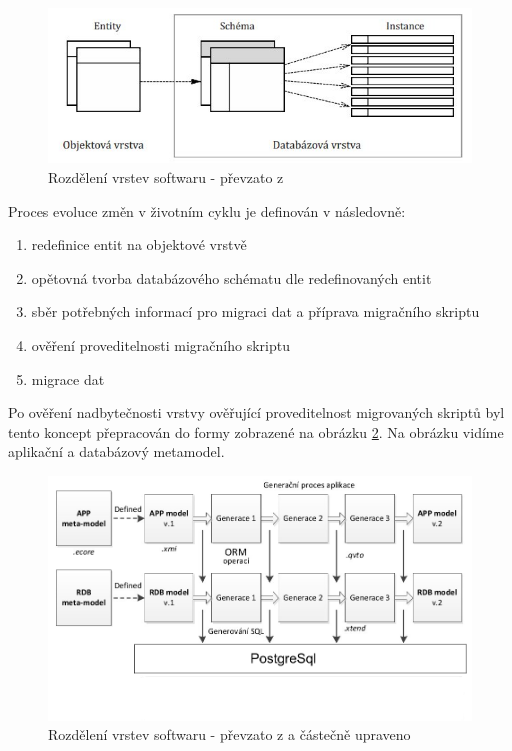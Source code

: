 \documentclass[11pt,twoside,a4paper]{book}
\begin{document}
\begin{figure}[H]
\begin{center}
\includegraphics[width=15cm]{figures/framework_structura}
\caption{Rozdělení vrstev softwaru - převzato z \cite{Mazanec}}
\label{fig:mazanma:framework}
\end{center}
\end{figure}
%
Proces evoluce změn v životním cyklu je definován v \cite{Jezek}
následovně:
%
%
\begin{enumerate}\label{framework:jezek_def}
  \item redefinice entit na objektové vrstvě
  \item opětovná tvorba databázového schématu dle redefinovaných entit
  \item sběr potřebných informací pro migraci dat a příprava migračního skriptu
  \item ověření proveditelnosti migračního skriptu
  \item migrace dat
\end{enumerate}
%
Po ověření nadbytečnosti vrstvy ověřující proveditelnost migrovaných skriptů byl
tento koncept přepracován do formy zobrazené na obrázku
\ref{fig:framework:modified}. Na obrázku vidíme aplikační a databázový metamodel.
%
\begin{figure}[H]
\begin{center}
\includegraphics[width=15cm]{figures/framework_structura_tarant_modified}
\caption{Rozdělení vrstev softwaru - převzato z \cite{Tarant_bp} a částečně
upraveno}
\label{fig:framework:modified}
\end{center}
\end{figure}
\end{document}
